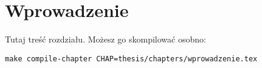 \documentclass[../main/main.tex]{subfiles}
\begin{document}
\chapter{Wprowadzenie}

Tutaj treść rozdziału. 
Możesz go skompilować osobno:
\begin{verbatim}
make compile-chapter CHAP=thesis/chapters/wprowadzenie.tex
\end{verbatim}
\end{document}
